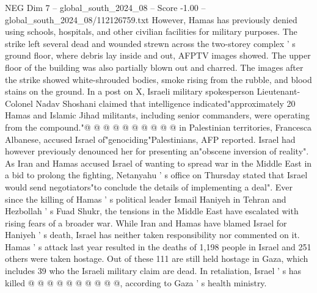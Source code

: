 \begin{textsample}{NEG Dim 7 – global\_south\_2024\_08 – Score -1.00 – global\_south\_2024\_08/112126759.txt}
However, Hamas has previously denied using schools, hospitals, and other civilian facilities for military purposes.
The strike left several dead and wounded strewn across the two-storey complex ' s ground floor, where debris lay inside and out, AFPTV images showed.
The upper floor of the building was also partially blown out and charred.
The images after the strike showed white-shrouded bodies, smoke rising from the rubble, and blood stains on the ground.
In a post on X, Israeli military spokesperson Lieutenant-Colonel Nadav Shoshani claimed that intelligence indicated"approximately 20 Hamas and Islamic Jihad militants, including senior commanders, were operating from the compound."@ @ @ @ @ @ @ @ @ @ in Palestinian territories, Francesca Albanese, accused Israel of"genociding"Palestinians, AFP reported.
Israel had however previously denounced her for presenting an"obscene inversion of reality".
As Iran and Hamas accused Israel of wanting to spread war in the Middle East in a bid to prolong the fighting, Netanyahu ' s office on Thursday stated that Israel would send negotiators"to conclude the details of implementing a deal".
Ever since the killing of Hamas ' s political leader Ismail Haniyeh in Tehran and Hezbollah ' s Fuad Shukr, the tensions in the Middle East have escalated with rising fears of a broader war.
While Iran and Hamas have blamed Israel for Haniyeh ' s death, Israel has neither taken responsibility nor commented on it.
Hamas ' s attack last year resulted in the deaths of 1,198 people in Israel and 251 others were taken hostage.
Out of these 111 are still held hostage in Gaza, which includes 39 who the Israeli military claim are dead.
In retaliation, Israel ' s has killed @ @ @ @ @ @ @ @ @ @, according to Gaza ' s health ministry.

\end{textsample}
